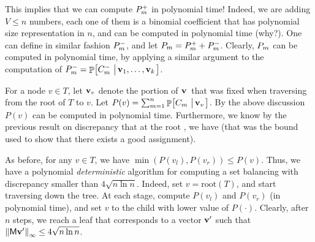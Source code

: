 This implies that we can compute $P_m^+$ in polynomial
time!  Indeed, we are adding $V \leq n$ numbers, each one of
them is a binomial coefficient that has polynomial size
representation in $n$, and can be computed in polynomial
time (why?).  One can define in similar fashion $P_m^-$, and
let $P_m = P_m^+ + P_m^-$. Clearly, $P_m$ can be computed in
polynomial time, by applying a similar argument to the
computation of $P_\ind^- = \Prob{C_\ind^- \sep{\vecA_1, \ldots,
      \vecA_k}}$.


For a node $v \in T$, let $\mathbf{v}_v$ denote the portion of $\mathbf{v}\,$
that was fixed when traversing from the root of $T$ to $v$.  Let
$P(v) = \sum_{\ind=1}^{n} \Prob{C_\ind \sep{\vecA_v}}$.%
  By the above
discussion $P(v)$ can be computed in polynomial time.  Furthermore, we
know by the previous result on discrepancy that at the root , we have  (that was
the bound used to show that there exists a good assignment).

As before, for any $v \in T$, we have $\min(P(v_l), P(v_r)) \leq P(v)$.%
Thus, we have a polynomial \emph{deterministic} algorithm
for computing a set balancing with discrepancy smaller than $4\sqrt{n
   \ln{n}}$. Indeed, set $v = \mathrm{root}(T)$, and start traversing down the
tree. At each stage, compute $P(v_l)$ and $P(v_r)$ (in polynomial
time), and set $v$ to the child with lower value of
$P(\cdot)$. Clearly, after $n$ steps, we reach a leaf that
corresponds to a vector $\mathbf{v}'$ such that $\left\| {\mathsf{M} \mathbf{v}'} \right\|_\infty \leq 4 \sqrt{n \ln{n}}$.%

